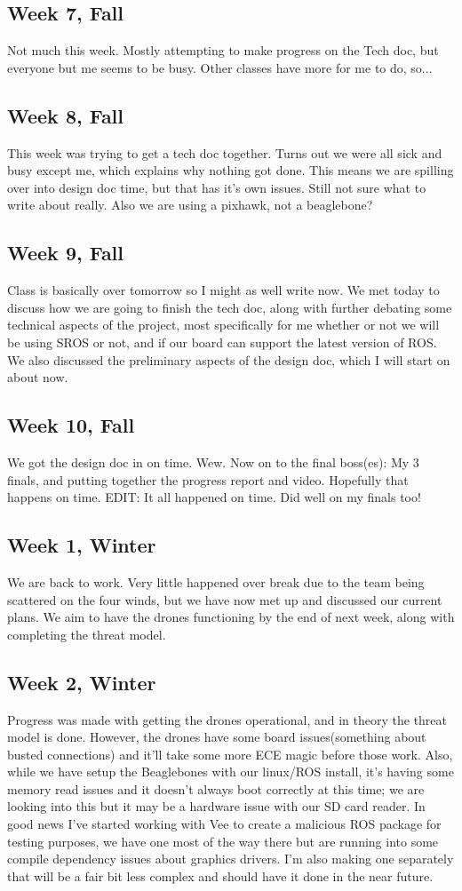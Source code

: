 \subsection{Week 7, Fall}
Not much this week. Mostly attempting to make progress on the Tech doc, 
but everyone but me seems to be busy. Other classes have more for me to do, 
so...
\subsection{Week 8, Fall}
This week was trying to get a tech doc together. Turns out we were all sick 
and busy except me, which explains why nothing got done. This means we are 
spilling over into design doc time, but that has it's own issues. Still 
not sure what to write about really. Also we are using a pixhawk, not a 
beaglebone? 
\subsection{Week 9, Fall}
Class is basically over tomorrow so I might as well write now. We met 
today to discuss how we are going to finish the tech doc, along with 
further debating some technical aspects of the project, most specifically 
for me whether or not we will be using SROS or not, and if our board can 
support the latest version of ROS. We also discussed the preliminary aspects 
of the design doc, which I will start on about now.
\subsection{Week 10, Fall}
We got the design doc in on time. Wew. Now on to the final boss(es): My 3 
finals, and putting together the progress report and video. Hopefully that 
happens on time. EDIT: It all happened on time. Did well on my finals too!
\subsection{Week 1, Winter}
We are back to work. Very little happened over break due to the team being 
scattered on the four winds, but we have now met up and discussed our current 
plans. We aim to have the drones functioning by the end of next week, along 
with completing the threat model. 
\subsection{Week 2, Winter}
Progress was made with getting the drones operational, and in theory the threat 
model is done. However, the drones have some board issues(something about 
busted connections) and it'll take some more ECE magic before those work. 
Also, while we have setup the Beaglebones with our linux/ROS install, it's 
having some memory read issues and it doesn't always boot correctly at this 
time; we are looking into this but it may be a hardware issue with our SD card 
reader. In good news I've started working with Vee to create a malicious ROS 
package for testing purposes, we have one most of the way there but are running
into some compile dependency issues about graphics drivers. I'm also making one 
separately that will be a fair bit less complex and should have it done in the 
near future.
